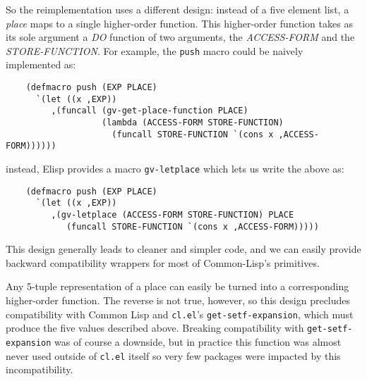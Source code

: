 \documentclass[format=acmsmall, review=false, screen=true]{acmart}
\newcommand \Elisp {Elisp}
\begin{document}
So the reimplementation uses a different design: instead of a five element
list, a \emph{place} maps to a single higher-order function.
This higher-order function takes as its sole argument a \textsl{DO} function
of two arguments, the \textsl{ACCESS-FORM} and the \textsl{STORE-FUNCTION}.
For example, the \texttt{push} macro could be naively implemented as:
\begin{verbatim}
    (defmacro push (EXP PLACE)
      `(let ((x ,EXP))
         ,(funcall (gv-get-place-function PLACE)
                   (lambda (ACCESS-FORM STORE-FUNCTION)
                     (funcall STORE-FUNCTION `(cons x ,ACCESS-FORM))))))
\end{verbatim}
instead, \Elisp{} provides a macro \texttt{gv-letplace} which lets us
write the above as:
\begin{verbatim}
    (defmacro push (EXP PLACE)
      `(let ((x ,EXP))
         ,(gv-letplace (ACCESS-FORM STORE-FUNCTION) PLACE
            (funcall STORE-FUNCTION `(cons x ,ACCESS-FORM)))))
\end{verbatim}
This design generally leads to cleaner and simpler code, and we can easily
provide backward compatibility wrappers for most of Common-Lisp's
primitives.

Any 5-tuple representation of a place can easily be turned into
a corresponding higher-order function.  The reverse is not true, however, so
this design precludes compatibility with Common Lisp and
\texttt{cl.el}'s \texttt{get-setf-expansion}, which must produce the
five values described above.
Breaking compatibility with \texttt{get-setf-expansion}
was of course
a downside, but in practice this function was almost never used outside of
\texttt{cl.el} itself so very few packages were impacted by
this incompatibility.
\end{document}
